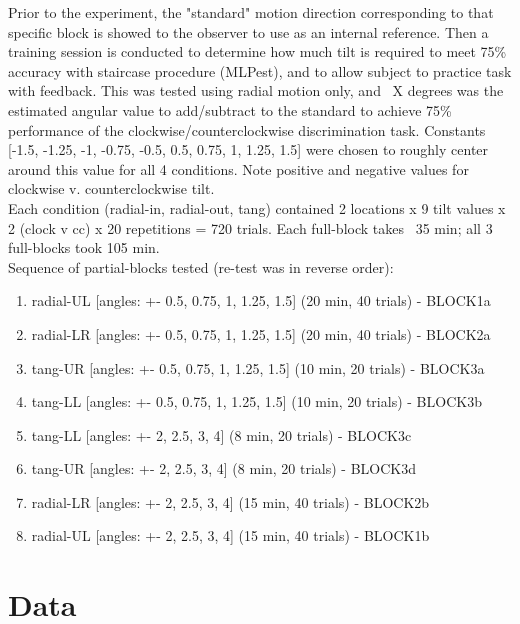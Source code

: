 \documentclass[11pt]{article} %
\begin{document}
Prior to the experiment, the "standard" motion direction corresponding to that specific block is showed to the observer to use as an internal reference. Then a training session is conducted to determine how much tilt is required to meet 75\% accuracy with staircase procedure (MLPest), and to allow subject to practice task with feedback. This was tested using radial motion only, and ~X degrees was the estimated angular value to add/subtract to the standard to achieve 75\% performance of the clockwise/counterclockwise discrimination task. Constants [-1.5, -1.25, -1, -0.75, -0.5, 0.5, 0.75, 1, 1.25, 1.5] were chosen to roughly center around this value for all 4 conditions. Note positive and negative values for clockwise v. counterclockwise tilt.
\\
Each condition (radial-in, radial-out, tang) contained 2 locations x 9 tilt values x 2 (clock v cc) x 20 repetitions = 720 trials. Each full-block takes ~35 min; all 3 full-blocks took 105 min. 
\\
Sequence of partial-blocks tested (re-test was in reverse order): 
\begin{enumerate}
\item radial-UL [angles: +- 0.5, 0.75, 1, 1.25, 1.5] (20 min, 40 trials) - BLOCK1a
\item radial-LR [angles: +- 0.5, 0.75, 1, 1.25, 1.5] (20 min, 40 trials) - BLOCK2a
\item tang-UR [angles: +- 0.5, 0.75, 1, 1.25, 1.5] (10 min, 20 trials) - BLOCK3a
\item tang-LL [angles: +- 0.5, 0.75, 1, 1.25, 1.5] (10 min, 20 trials) - BLOCK3b
\item tang-LL [angles: +- 2, 2.5, 3, 4] (8 min, 20 trials) - BLOCK3c
\item tang-UR [angles: +- 2, 2.5, 3, 4] (8 min, 20 trials) - BLOCK3d
\item radial-LR [angles: +- 2, 2.5, 3, 4] (15 min, 40 trials) - BLOCK2b
\item radial-UL [angles: +- 2, 2.5, 3, 4] (15 min, 40 trials) - BLOCK1b
\end{enumerate}

\section{Data}
\end{document}
